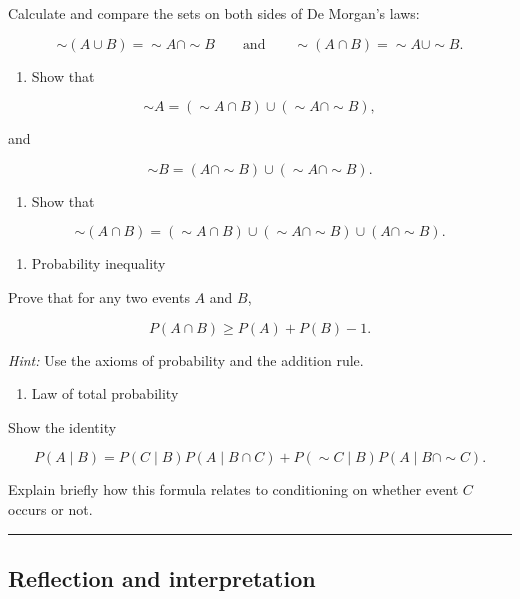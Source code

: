 \documentclass[
  letterpaper,
  DIV=11,
  numbers=noendperiod]{scrreprt}
\providecommand{\tightlist}{%
  \setlength{\itemsep}{0pt}\setlength{\parskip}{0pt}}
\begin{document}
Calculate and compare the sets on both sides of De Morgan's laws:

\[
\sim (A \cup B) = \sim A \cap \sim B
\qquad \text{and} \qquad
\sim (A \cap B) = \sim A \cup \sim B.
\]

\begin{enumerate}
\def\labelenumi{(\alph{enumi})}
\setcounter{enumi}{1}
\tightlist
\item
  Show that
\end{enumerate}

\[
\sim A = (\sim A \cap B) \cup (\sim A \cap \sim B),
\]

and

\[
\sim B = (A \cap \sim B) \cup (\sim A \cap \sim B).
\]

\begin{enumerate}
\def\labelenumi{(\alph{enumi})}
\setcounter{enumi}{2}
\tightlist
\item
  Show that
\end{enumerate}

\[
\sim (A \cap B)
= (\sim A \cap B) \cup (\sim A \cap \sim B) \cup (A \cap \sim B).
\]

\begin{enumerate}
\def\labelenumi{\arabic{enumi}.}
\setcounter{enumi}{17}
\tightlist
\item
  Probability inequality
\end{enumerate}

Prove that for any two events \(A\) and \(B\),

\[
P(A \cap B) \ge P(A) + P(B) - 1.
\]

\emph{Hint:} Use the axioms of probability and the addition rule.

\begin{enumerate}
\def\labelenumi{\arabic{enumi}.}
\setcounter{enumi}{18}
\tightlist
\item
  Law of total probability
\end{enumerate}

Show the identity

\[
P(A \mid B)
= P(C \mid B)P(A \mid B \cap C)
+ P(\sim C \mid B)P(A \mid B \cap \sim C).
\]

Explain briefly how this formula relates to conditioning on whether
event \(C\) occurs or not.

\begin{center}\rule{0.5\linewidth}{0.5pt}\end{center}

\subsection{Reflection and
interpretation}\label{reflection-and-interpretation}
\end{document}
